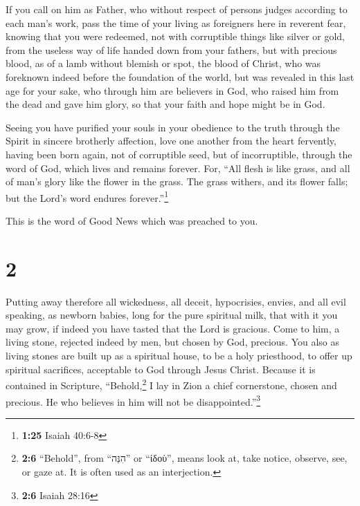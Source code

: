  If you call on him as Father, who without respect of
persons judges according to each man's work, pass the time of your
living as foreigners here in reverent fear,  knowing that
you were redeemed, not with corruptible things like silver or gold, from
the useless way of life handed down from your fathers, 
but with precious blood, as of a lamb without blemish or spot, the blood
of Christ,  who was foreknown indeed before the
foundation of the world, but was revealed in this last age for your
sake,  who through him are believers in God, who raised
him from the dead and gave him glory, so that your faith and hope might
be in God.

 Seeing you have purified your souls in your obedience to
the truth through the Spirit in sincere brotherly affection, love one
another from the heart fervently,  having been born
again, not of corruptible seed, but of incorruptible, through the word
of God, which lives and remains forever.  For, ``All
flesh is like grass, and all of man's glory like the flower in the
grass. The grass withers, and its flower falls;  but the
Lord's word endures forever.''\footnote{\textbf{1:25} Isaiah 40:6-8}

This is the word of Good News which was preached to you.

\hypertarget{section-1}{%
\section{2}\label{section-1}}

 Putting away therefore all wickedness, all deceit,
hypocrisies, envies, and all evil speaking,  as newborn
babies, long for the pure spiritual milk, that with it you may grow,
 if indeed you have tasted that the Lord is gracious.
 Come to him, a living stone, rejected indeed by men, but
chosen by God, precious.  You also as living stones are
built up as a spiritual house, to be a holy priesthood, to offer up
spiritual sacrifices, acceptable to God through Jesus Christ.
 Because it is contained in Scripture,
``Behold,\footnote{\textbf{2:6} ``Behold'', from ``הִנֵּה'' or ``ἰδοὺ'',
  means look at, take notice, observe, see, or gaze at. It is often used
  as an interjection.} I lay in Zion a chief cornerstone, chosen and
precious. He who believes in him will not be disappointed.''\footnote{\textbf{2:6}
  Isaiah 28:16}

